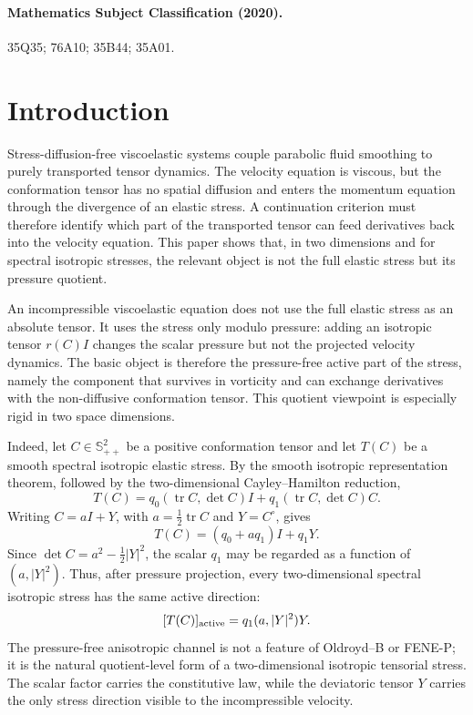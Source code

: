 \documentclass[11pt]{article}
\newcommand{\Spp}{\mathbb S_{++}}
\newcommand{\tr}{\operatorname{tr}}
\begin{document}
\paragraph{Mathematics Subject Classification (2020).}
35Q35; 76A10; 35B44; 35A01.

\section{Introduction}

Stress-diffusion-free viscoelastic systems couple parabolic fluid smoothing to
purely transported tensor dynamics.  The velocity equation is viscous, but the
conformation tensor has no spatial diffusion and enters the momentum equation
through the divergence of an elastic stress.  A continuation criterion must
therefore identify which part of the transported tensor can feed derivatives
back into the velocity equation.  This paper shows that, in two dimensions and
for spectral isotropic stresses, the relevant object is not the full elastic
stress but its pressure quotient.

An incompressible viscoelastic equation does not use the full elastic stress as
an absolute tensor.  It uses the stress only modulo pressure: adding an
isotropic tensor \(r(C)I\) changes the scalar pressure but not the projected
velocity dynamics.  The basic object is therefore the pressure-free active
part of the stress, namely the component that survives in vorticity and can
exchange derivatives with the non-diffusive conformation tensor.  This quotient
viewpoint is especially rigid in two space dimensions.

Indeed, let \(C\in\Spp^2\) be a positive conformation tensor and let
\(T(C)\) be a smooth spectral isotropic elastic stress.  By the smooth
isotropic representation theorem, followed by the two-dimensional
Cayley--Hamilton reduction,
\[
  T(C)=q_0(\tr C,\det C)I+q_1(\tr C,\det C)C .
\]
Writing \(C=aI+Y\), with \(a=\frac12\tr C\) and \(Y=C^\circ\), gives
\[
  T(C)=(q_0+aq_1)I+q_1Y .
\]
Since \(\det C=a^2-\frac12|Y|^2\), the scalar \(q_1\) may be regarded as a
function of \((a,|Y|^2)\).  Thus, after pressure projection, every
two-dimensional spectral isotropic stress has the same active direction:
\[
  [T(C)]_{\rm active}=q_1(a,|Y|^2)Y .
\]
The pressure-free anisotropic channel is not a feature of Oldroyd--B or FENE-P;
it is the natural quotient-level form of a two-dimensional isotropic tensorial
stress.  The scalar factor carries the constitutive law, while the deviatoric
tensor \(Y\) carries the only stress direction visible to the incompressible
velocity.
\end{document}
